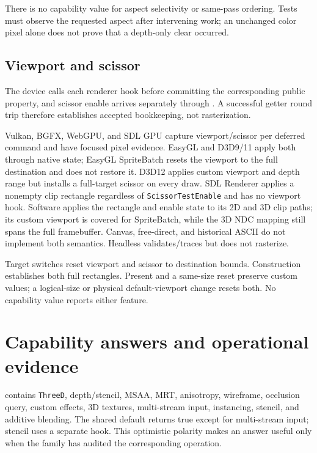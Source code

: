 There is no capability value for aspect selectivity or same-pass ordering. Tests must observe the
requested aspect after intervening work; an unchanged color pixel alone does not prove that a
depth-only clear occurred.

\subsection{Viewport and scissor}
\label{sec:backend-viewport-scissor-matrix}

The device calls each renderer hook before committing the corresponding public property, and
scissor enable arrives separately through . A successful getter round
trip therefore establishes accepted bookkeeping, not rasterization.

Vulkan, BGFX, WebGPU, and SDL GPU capture viewport/scissor per deferred command and have focused
pixel evidence. EasyGL and D3D9/11 apply both through native state; EasyGL SpriteBatch resets the
viewport to the full destination and does not restore it. D3D12 applies custom viewport and depth
range but installs a full-target scissor on every draw. SDL Renderer applies a nonempty clip
rectangle regardless of \texttt{ScissorTestEnable} and has no viewport hook. Software applies the
rectangle and enable state to its 2D and 3D clip paths; its custom viewport is covered for
SpriteBatch, while the 3D NDC mapping still spans the full framebuffer. Canvas, free-direct, and
historical ASCII do not implement both semantics. Headless validates/traces but does not rasterize.

Target switches reset viewport and scissor to destination bounds. Construction establishes both
full rectangles. Present and a same-size reset preserve custom values; a logical-size or physical
default-viewport change resets both. No capability value reports either feature.

\section{Capability answers and operational evidence}
\label{sec:graphicscapability}

 contains \texttt{ThreeD}, depth/stencil, MSAA, MRT, anisotropy,
wireframe, occlusion query, custom effects, 3D textures, multi-stream input, instancing, stencil,
and additive blending. The shared default returns true except for multi-stream input; stencil
uses a separate hook. This optimistic polarity makes an answer useful only when the family has
audited the corresponding operation.

